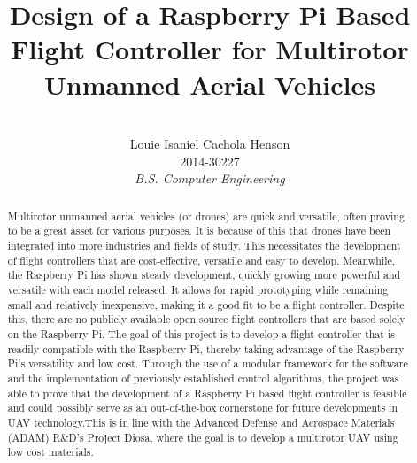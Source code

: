 \documentclass[english]{upeeei}
\begin{document}

\title{Design of a Raspberry Pi Based Flight Controller for Multirotor Unmanned Aerial Vehicles} 


\author{
\\Louie Isaniel Cachola Henson \\ 2014-30227 \\ \emph{B.S. Computer Engineering}
}




\maketitle

\begin{abstract} 



Multirotor unmanned aerial vehicles (or drones) are quick and versatile, often 
proving to be a great asset for various purposes. It is because of this that drones have been integrated into
more industries and fields of study. This necessitates the development of flight controllers that are
cost-effective, versatile and easy to develop. Meanwhile, the Raspberry Pi has shown steady development, quickly
growing more powerful and versatile with each model released. It allows for rapid prototyping while remaining
small and relatively inexpensive, making it a good fit to be a flight controller. Despite this, there are no
publicly available open source flight controllers that are based solely on the Raspberry Pi.
The goal of this project is to develop a flight controller that is readily compatible with the Raspberry Pi, 
thereby taking advantage of the Raspberry Pi's versatility and low cost. Through the use of a modular framework
for the software and the implementation of previously established control algorithms, the project was able to prove
that the development of a Raspberry Pi based flight controller is feasible and could possibly serve as an out-of-the-box
cornerstone for future developments in UAV technology.This is in line with the Advanced 
Defense and Aerospace Materials (ADAM) R\&D's Project Diosa, where the goal is to develop a multirotor UAV using 
low cost materials.


\end{abstract}
\end{document}
